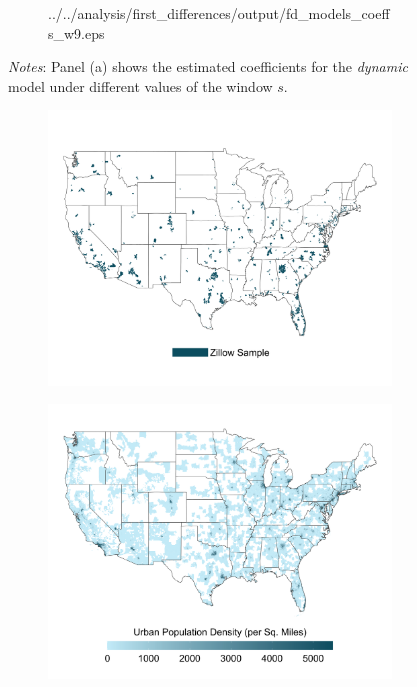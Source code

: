 \documentclass{article}
\begin{document}
\begin{figure}[htb!]
\begin{subfigure}[b]{0.5\textwidth}
		{../../analysis/first_differences/output/fd_models_coeffs_w9.eps}
	\end{subfigure}
	\begin{minipage}{0.95\textwidth} \footnotesize
		\vspace{2mm} 
		\textit{Notes}: Panel (a) shows the estimated coefficients for the \textit{dynamic} model under 
		different values of the window $s$.
	\end{minipage}
\end{figure}

\clearpage
\begin{figure}
	\caption{Comparison Between Zillow Sample and Population Density in CBSAs}
	\begin{subfigure}[b]{\textwidth}\centering
		\includegraphics[width = .9\textwidth]{../../analysis/descriptive_maps/output/sample_map.png}
	\end{subfigure}
	\quad 
	\begin{subfigure}[b]{\textwidth}\centering
		\includegraphics[width = .9\textwidth]{../../analysis/descriptive_maps/output/popurban_density_map.png}
	\end{subfigure}
\end{figure}
\end{document}
